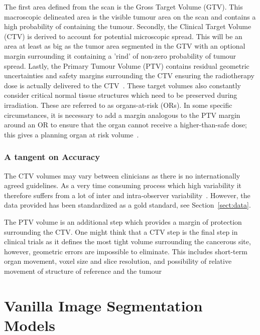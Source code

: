 \documentclass[11pt,twoside]{report}
\begin{document}
The first area defined from the scan is the Gross Target Volume (GTV). This macroscopic delineated area is the visible tumour area on the scan and contains a high probability of containing the tumour. Secondly, the Clinical Target Volume (CTV) is derived to account for potential microscopic spread. This will be an area at least as big as the tumor area segmented in the GTV with an optional margin surrounding it containing a 'rind' of non-zero probability of tumour spread. Lastly, the Primary Tumour Volume (PTV) contains residual geometric uncertainties and safety margins surrounding the CTV ensuring the radiotherapy dose is actually delivered to the CTV~\cite{tumor-delineation,defining-target-volumes,Lin2021-oz,personalised-PTV-strategies}. These target volumes also constantly consider critical normal tissue structures which need to be preserved during irradiation. These are referred to as organs-at-risk (ORs). In some specific circumstances, it is necessary to add a margin analogous to the PTV margin around an OR to ensure that the organ cannot receive a higher-than-safe dose; this gives a planning organ at risk volume~\cite{defining-target-volumes}.

\subsubsection{A tangent on Accuracy}

The CTV volumes may vary between clinicians as there is no internationally agreed guidelines. As a very time consuming process which high variability it therefore suffers from a lot of inter and intra-observer variability~\cite{Lin2021-oz}. However, the data provided has been standardized as a gold standard, see Section~\ref{sect:data}.

The PTV volume is an additional step which provides a margin of protection surrounding the CTV. One might think that a CTV step is the final step in clinical trials as it defines the most tight volume surrounding the cancerous site, however, geometric errors are impossible to eliminate. This includes short-term organ movement, voxel size and slice resolution, and possibility of relative movement of structure of reference and the tumour~\cite{VANHERK200452}

\section{Vanilla Image Segmentation Models}\label{sect:vanilla-image-segmentation-models}
\end{document}
